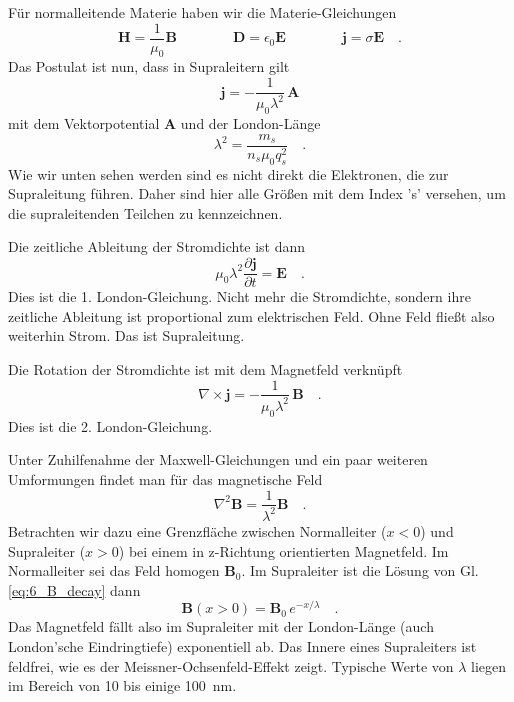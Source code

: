Für normalleitende Materie haben wir die Materie-Gleichungen
\begin{equation}
    \bm{H} = \frac{1}{\mu_0} \bm{B} \qquad\qquad
    \bm{D} = \epsilon_0 \bm{E} \qquad\qquad
    \bm{j} = \sigma \bm{E} \quad .
\end{equation}
Das Postulat ist nun, dass in Supraleitern gilt
\begin{equation}
    \bm{j} = - \frac{1}{\mu_0 \lambda^2} \, \bm{A}
\end{equation}
mit dem Vektorpotential $\bm{A}$ und  der London-Länge 
\begin{equation}
    \lambda^2 = \frac{m_s}{n_s \mu_0 q_s^2} \quad .
\end{equation}
Wie wir unten sehen werden sind es nicht direkt die Elektronen, die zur Supraleitung führen. Daher sind hier alle Größen mit dem Index 's' versehen, um die supraleitenden Teilchen zu kennzeichnen. 

Die zeitliche Ableitung der Stromdichte ist dann
\begin{equation}
    \mu_0 \lambda^2  \frac{\partial  \bm{j}}{\partial t} = \bm{E} \quad .
\end{equation}
Dies ist die 1. London-Gleichung.
Nicht mehr die Stromdichte, sondern ihre zeitliche Ableitung ist proportional zum elektrischen Feld. Ohne Feld fließt also weiterhin Strom. Das ist Supraleitung.

Die Rotation der Stromdichte ist mit dem Magnetfeld verknüpft
\begin{equation}
    \nabla \times \bm{j} =  - \frac{1}{\mu_0 \lambda^2} \, \bm{B} \quad .
\end{equation}
Dies ist die 2. London-Gleichung.


Unter Zuhilfenahme der Maxwell-Gleichungen und ein paar weiteren Umformungen findet man für das magnetische Feld
\begin{equation}
    \nabla^2 \bm{B} = \frac{1}{\lambda^2} \bm{B} \quad . \label{eq:6_B_decay}
\end{equation}
Betrachten wir dazu eine Grenzfläche zwischen Normalleiter ($x<0$) und Supraleiter ($x>0$) bei einem in z-Richtung orientierten Magnetfeld. Im Normalleiter sei das Feld homogen $\bm{B}_0$. Im Supraleiter ist die Lösung von Gl.\ref{eq:6_B_decay} dann
\begin{equation}
    \bm{B}(x>0) = \bm{B}_0 \, e^{- x / \lambda} \quad .
\end{equation}
Das Magnetfeld fällt also im Supraleiter mit der London-Länge (auch London'sche Eindringtiefe) exponentiell ab. Das Innere eines Supraleiters ist feldfrei, wie es der Meissner-Ochsenfeld-Effekt zeigt. Typische Werte von $\lambda$ liegen im Bereich von 10 bis einige 100~nm.




